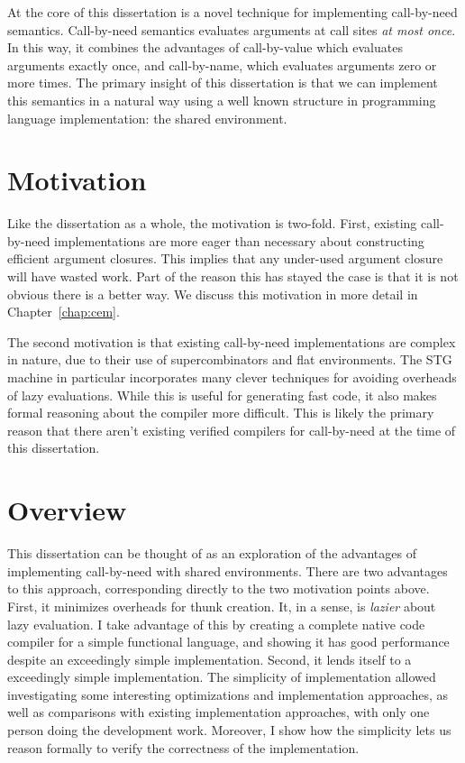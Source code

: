 At the core of this dissertation is a novel technique for implementing call-by-need
semantics. Call-by-need semantics evaluates arguments at call sites \emph{at most
once}. In this way, it combines the advantages of call-by-value which evaluates
arguments exactly once, and call-by-name, which evaluates arguments zero or more
times. The primary insight of this dissertation is that we can implement this
semantics in a natural way using a well known structure in programming language
implementation: the shared environment. 

\section{Motivation}

Like the dissertation as a whole, the motivation is two-fold. First, existing
call-by-need implementations are more eager than necessary about constructing
efficient argument closures. This implies that any under-used argument closure
will have wasted work. Part of the reason this has stayed the case is that it is
not obvious there is a better way. We discuss this motivation in more detail in
Chapter~\ref{chap:cem}. 

The second motivation is that existing call-by-need implementations are complex
in nature, due to their use of supercombinators and flat environments. The STG
machine in particular incorporates many clever techniques for avoiding overheads
of lazy evaluations. While this is useful for generating fast code, it also
makes formal reasoning about the compiler more difficult. This is likely the
primary reason that there aren't existing verified compilers for call-by-need at
the time of this dissertation.

\section{Overview}

This dissertation can be thought of as an exploration of the advantages of
implementing call-by-need with shared environments. There are two advantages to
this approach, corresponding directly to the two motivation points above. First,
it minimizes overheads for thunk creation. It, in a sense, is \emph{lazier}
about lazy evaluation. I take advantage of this by creating a complete native
code compiler for a simple functional language, and showing it has good
performance despite an exceedingly simple implementation. Second, it lends
itself to a exceedingly simple implementation. The simplicity of implementation
allowed investigating some interesting optimizations and implementation
approaches, as well as comparisons with existing implementation approaches, with
only one person doing the development work. Moreover, I show how the simplicity
lets us reason formally to verify the correctness of the implementation.

